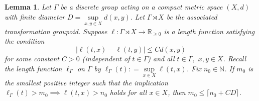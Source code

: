 \documentclass[a4paper,11pt,reqno]{amsart}
\theoremstyle{plain}
\newtheorem{lem}[thm]{Lemma}
\theoremstyle{mainthmstyle}
\theoremstyle{named}
\numberwithin{equation}{section}
\begin{document}
\begin{lem} \label{length-Lip}
Let $\Gamma$ be a discrete group acting on a compact metric space $(X, d)$ with finite diameter $D = \sup\limits_{x,y \in X} d(x,y).$ Let $\Gamma \rtimes X$ be the associated transformation groupoid. Suppose $\ell : \Gamma \rtimes X \to \mathbb{R}_{\ge 0}$ is a length function satisfying the condition
\begin{equation} \label{Lip-length}
    |\ell(t, x) - \ell(t, y)| \le C d(x, y)
\end{equation}
for some constant $C > 0$ (independent of $t \in \Gamma$) and all $t \in \Gamma,$ $x, y \in X$. Recall the length function $\ell_{\Gamma}$ on $\Gamma$ by $\ell_{\Gamma}(t) : = \sup\limits_{x \in X} \ell(t, x)$. Fix $n_0 \in \mathbb{N}$. If $m_0$ is the smallest positive integer such that the implication $\ell_{\Gamma}(t) > m_0 \implies \ell(t, x) > n_0$ holds for all $x \in X$, then $m_0 \le \lceil n_0 + CD \rceil$.
\end{lem}
\end{document}
